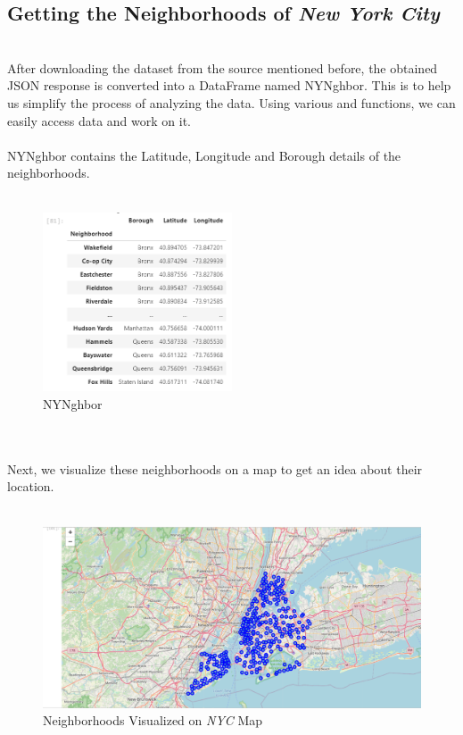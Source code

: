 \documentclass{article}
\begin{document}
\subsection{Getting the Neighborhoods of \textit{New York City}}\\
{After downloading the dataset from the source mentioned before, the obtained JSON response is converted into a  DataFrame named NYNghbor. This is to help us simplify the process of analyzing the data. Using various  and  functions, we can easily access data and work on it.}\\\\
{NYNghbor contains the Latitude, Longitude and Borough details of the neighborhoods.}\\\\
\begin{figure}[h]
\caption{NYNghbor}
\centering
\includegraphics[width=0.5\textwidth]{images/Screenshot (36).png}
\end{figure}\\\\
{Next, we visualize these neighborhoods on a map to get an idea about their location.}\\\\\pagebreak
\begin{figure}[h]
\caption{Neighborhoods Visualized on \textit{NYC} Map}
\centering
\includegraphics[width=\textwidth]{images/Screenshot (37).png}
\end{figure}\\\\
\end{document}
